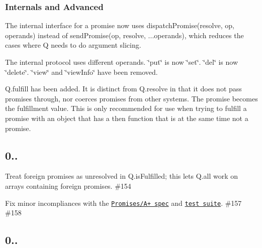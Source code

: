 \subsubsection*{Internals and Advanced}


\begin{DoxyItemize}
\item The internal interface for a promise now uses {\ttfamily dispatch\+Promise(resolve, op, operands)} instead of {\ttfamily send\+Promise(op, resolve, ...operands)}, which reduces the cases where Q needs to do argument slicing.
\item The internal protocol uses different operands. \char`\"{}put\char`\"{} is now \char`\"{}set\char`\"{}. \char`\"{}del\char`\"{} is now \char`\"{}delete\char`\"{}. \char`\"{}view\char`\"{} and \char`\"{}view\+Info\char`\"{} have been removed.
\item {\ttfamily Q.\+fulfill} has been added. It is distinct from {\ttfamily Q.\+resolve} in that it does not pass promises through, nor coerces promises from other systems. The promise becomes the fulfillment value. This is only recommended for use when trying to fulfill a promise with an object that has a {\ttfamily then} function that is at the same time not a promise.
\end{DoxyItemize}

\subsection*{0..}


\begin{DoxyItemize}
\item Treat foreign promises as unresolved in {\ttfamily Q.\+is\+Fulfilled}; this lets {\ttfamily Q.\+all} work on arrays containing foreign promises. \#154
\item Fix minor incompliances with the \href{http://promises-aplus.github.com/promises-spec/}{\tt Promises/\+A+ spec} and \href{https://github.com/promises-aplus/promises-tests}{\tt test suite}. \#157 \#158
\end{DoxyItemize}

\subsection*{0..}


